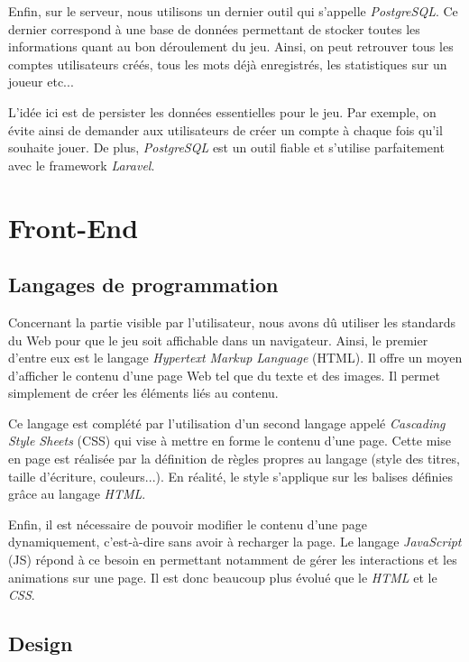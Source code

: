 \documentclass{tnreport}
\begin{document}
Enfin, sur le serveur, nous utilisons un dernier outil qui s'appelle \textit{PostgreSQL}. Ce dernier correspond à une base de données permettant de stocker toutes les informations quant au bon déroulement du jeu. Ainsi, on peut retrouver tous les comptes utilisateurs créés, tous les mots déjà enregistrés, les statistiques sur un joueur etc... 

L'idée ici est de persister les données essentielles pour le jeu. Par exemple, on évite ainsi de demander aux utilisateurs de créer un compte à chaque fois qu'il souhaite jouer. De plus, \textit{PostgreSQL} est un outil fiable et s'utilise parfaitement avec le framework \textit{Laravel}. 

\section{Front-End}

\subsection{Langages de programmation}

Concernant la partie visible par l'utilisateur, nous avons dû utiliser les standards du Web pour que le jeu soit affichable dans un navigateur. Ainsi, le premier d'entre eux est le langage \textit{Hypertext Markup Language} (HTML). Il offre un moyen d'afficher le contenu d'une page Web tel que du texte et des images. Il permet simplement de créer les éléments liés au contenu.

Ce langage est complété par l'utilisation d'un second langage appelé \textit{Cascading Style Sheets} (CSS) qui vise à mettre en forme le contenu d'une page. Cette mise en page est réalisée par la définition de règles propres au langage (style des titres, taille d'écriture, couleurs...). En réalité, le style s'applique sur les balises définies grâce au langage \textit{HTML}. 

Enfin, il est nécessaire de pouvoir modifier le contenu d'une page dynamiquement, c'est-à-dire sans avoir à recharger la page. Le langage \textit{JavaScript} (JS) répond à ce besoin en permettant notamment de gérer les interactions et les animations sur une page. Il est donc beaucoup plus évolué que le \textit{HTML} et le \textit{CSS}.

\subsection{Design}
\end{document}
